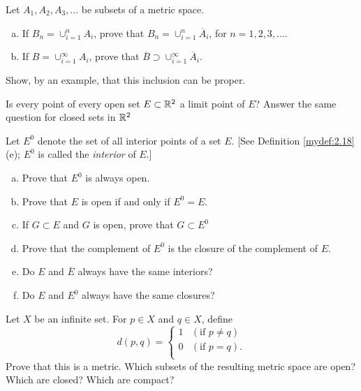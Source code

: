 \begin{myexercise}
    \label{ex:2.7}
    Let $A_1, A_2, A_3, ...$ be subsets of a metric space.
    \begin{enumerate}[(a)]
        \item If $B_n = \cup_{i=1}^n A_i$, 
        prove that $B_n = \cup_{i=1}^n \overline{A}_i$, 
        for $n = 1, 2, 3, ...$.
        \item If $B = \cup_{i=1}^{\infty} A_i$, 
        prove that $\overline{B} \supset \cup_{i=1}^{\infty}\overline{A}_i$.
    \end{enumerate}
    Show, by an example, that this inclusion can be proper.
\end{myexercise}

\begin{myexercise}
    \label{ex:2.8}
    Is every point of every open set $E \subset {\protect\mathbb R}^2$ a limit point of $E$? 
    Answer the same question for closed sets in ${\protect\mathbb R}^2$
\end{myexercise}

\begin{myexercise}
    \label{ex:2.9}
    Let $E^0$ denote the set of all interior points of a set $E$. 
    [See Definition \ref{mydef:2.18}(e);
    $E^0$ is called the \emph{interior} of $E$.]
    \begin{enumerate}[(a)]
        \item Prove that $E^0$ is always open.
        \item Prove that $E$ is open if and only if $E^0 = E$.
        \item If $G \subset E$ and $G$ is open, prove that $G \subset E^0$
        \item Prove that the complement of $E^0$ is the closure of the complement of $E$.
        \item Do $E$ and $\overline{E}$ always have the same interiors?
        \item Do $E$ and $E^0$ always have the same closures?
    \end{enumerate}
\end{myexercise}

\begin{myexercise}
    \label{ex:2.10}
    Let $X$ be an infinite set. 
    For $p \in X$ and $q \in X$, define
    \begin{equation*}
        d(p,q) = \left\{ 
            \begin{array}{ll}
                1 & (\text{if } p \neq q) \\
                0 & (\text{if } p =    q). \\
            \end{array}
         \right.
    \end{equation*}
    Prove that this is a metric. 
    Which subsets of the resulting metric space are open?
    Which are closed? 
    Which are compact?
\end{myexercise}

